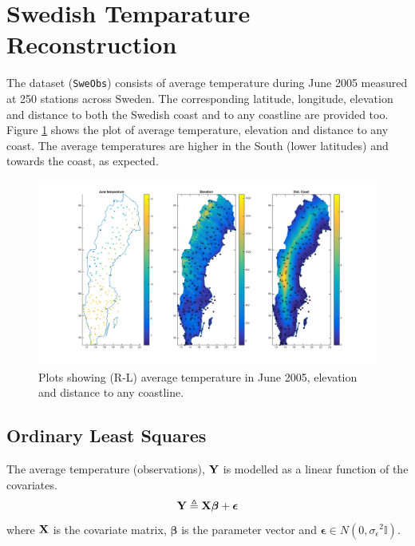 \documentclass[a4paper,10pt]{article}
\def\bY{{\bf Y}}
\def\bX{{\bf X}}
\def\bbeta{{\boldsymbol \beta}}
\def\sigmaeps{{\sigma_{\epsilon}}}
\begin{document}
\section{Swedish Temparature Reconstruction}
The dataset ({\texttt{SweObs}}) consists of average temperature during June 2005 measured at 250 stations across Sweden. The corresponding latitude, longitude, elevation and distance to both the Swedish coast and to any coastline are provided too. Figure \ref{fig:rawdataplot} shows the plot of average temperature, elevation and distance to any coast. The average temperatures are higher in the South (lower latitudes) and towards the coast, as expected.
\begin{figure}[ht]
	\centering
	\includegraphics[width=0.8\linewidth]{raw_data_plot.png}
	\caption{Plots showing (R-L) average temperature in June 2005, elevation and distance to any coastline.}
	\label{fig:rawdataplot}
\end{figure}
\subsection{Ordinary Least Squares}
The average temperature (observations), $\bY$ is modelled as a linear function of the covariates. 
\begin{equation*}
  \bY \triangleq \bX \bbeta +  {\boldsymbol \epsilon} 
\end{equation*}
where $\bX$ is the covariate matrix, $\bbeta$ is the parameter vector and ${\boldsymbol \epsilon} \in N(0, \sigmaeps^2 \mathbb{I})$.
\end{document}
